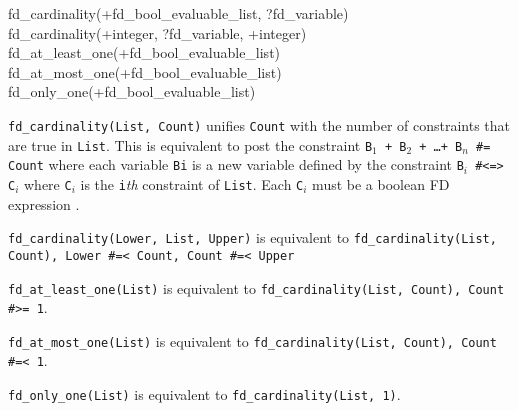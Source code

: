 \begin{TemplatesOneCol}
fd\_cardinality(+fd\_bool\_evaluable\_list, ?fd\_variable)\\
fd\_cardinality(+integer, ?fd\_variable, +integer)\\
fd\_at\_least\_one(+fd\_bool\_evaluable\_list)\\
fd\_at\_most\_one(+fd\_bool\_evaluable\_list)\\
fd\_only\_one(+fd\_bool\_evaluable\_list)

\end{TemplatesOneCol}

\Description

\texttt{fd\_cardinality(List, Count)} unifies \texttt{Count} with the number
of constraints that are true in \texttt{List}. This is equivalent to post
the constraint \texttt{B$_{1}$ + B$_{2}$ + \ldots + B$_{n}$ \#= Count}
where each variable \texttt{Bi} is a new variable defined by the constraint
\texttt{B$_{i}$ \#<=> C$_{i}$} where \texttt{C$_{i}$} is the
\texttt{i}\emph{th} constraint of \texttt{List}. Each \texttt{C$_{i}$}
must be a boolean FD expression .

\texttt{fd\_cardinality(Lower, List, Upper)} is equivalent to
\texttt{fd\_cardinality(List, Count), Lower \#=< Count, Count \#=<
Upper}

\texttt{fd\_at\_least\_one(List)} is equivalent to
\texttt{fd\_cardinality(List, Count), Count \#>= 1}.

\texttt{fd\_at\_most\_one(List)} is equivalent to
\texttt{fd\_cardinality(List, Count), Count \#=< 1}.

\texttt{fd\_only\_one(List)} is equivalent to \texttt{fd\_cardinality(List,
1)}.

\begin{PlErrors}









\end{PlErrors}

